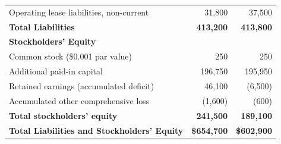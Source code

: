 \begin{tabularx}{\linewidth}{X r r}
  Operating lease liabilities, non-current & 31,800 & 37,500 \\
  \rowcolor{LightBG}
  \textbf{Total Liabilities} & \textbf{413,200} & \textbf{413,800} \\
  \midrule
  \textbf{Stockholders' Equity} & & \\
  Common stock (\$0.001 par value) & 250 & 250 \\
  Additional paid-in capital & 196,750 & 195,950 \\
  Retained earnings (accumulated deficit) & 46,100 & (6,500) \\
  Accumulated other comprehensive loss & (1,600) & (600) \\
  \rowcolor{LightBG}
  \textbf{Total stockholders' equity} & \textbf{241,500} & \textbf{189,100} \\
  \midrule
  \rowcolor{TableHeadBG}
  \textbf{Total Liabilities and Stockholders' Equity} & \textbf{\$654,700} & \textbf{\$602,900} \\
  \bottomrule
\end{tabularx}
